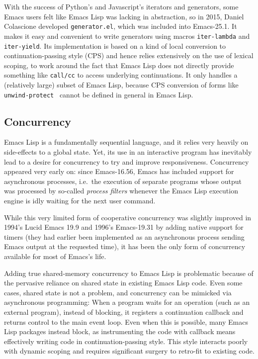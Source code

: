 \documentclass[format=acmsmall, review]{acmart}
\newcommand \Elisp {Emacs Lisp}
\begin{document}
With the success of Python's and Javascript's iterators and generators, some
Emacs users felt like \Elisp{} was lacking in abstraction, so in 2015,
Daniel Colascione developed \texttt{generator.el}, which was included
into Emacs-25.1.  It makes it easy and convenient to write generators using
macros \texttt{iter-lambda} and \texttt{iter-yield}.  Its implementation is
based on a kind of local conversion to continuation-passing style (CPS) and
hence relies extensively on the use of lexical scoping, to work around the
fact that \Elisp{} does not directly provide something like \texttt{call/cc}
to access underlying continuations.  It only handles a (relatively large)
subset of \Elisp{}, because CPS conversion of forms like
\texttt{unwind-protect}~\cite{HaynesFriedman1987} cannot be defined in general in \Elisp.

\subsection{Concurrency}
\label{sec:concurrency}

\Elisp{} is a fundamentally sequential language, and it relies very heavily
on side-effects to a global state.  Yet, its use in an interactive program
has inevitably lead to a desire for concurrency to try and improve
responsiveness.  Concurrency appeared very early on: since
Emacs-16.56, Emacs has included support for asynchronous processes, i.e.~the
execution of separate programs whose output was processed by so-called
\emph{process filters} whenever the \Elisp{} execution engine is idly
waiting for the next user command.

While this very limited form of cooperative concurrency was slightly
improved in 1994's Lucid Emacs 19.9 and 1996's Emacs-19.31 by adding native support for timers (they
had earlier been implemented as an asynchronous process sending Emacs output at
the requested time), it has been the only form of concurrency available for
most of Emacs's life.

Adding true shared-memory concurrency to \Elisp{} is problematic
because of the pervasive reliance on shared state in existing \Elisp{}
code.  Even some cases, shared state is not a problem, and concurrency
can be mimicked via asynchronous programming: When a program waits for
an operation (such as an external program), instead of blocking, it
registers a continuation callback and returns control to the main
event loop.  Even when this is possible, many \Elisp{} packages 
instead block, as instrumenting the code with callback means
effectively writing code in continuation-passing style.  This style
interacts poorly with dynamic scoping and requires significant surgery
to retro-fit to existing code.
\end{document}
